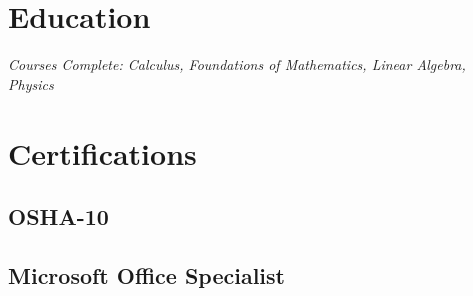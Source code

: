 \documentclass{my_resume}
\begin{document}
	\section{Education}
		\scriptsize{\textit{Courses Complete: Calculus, Foundations of Mathematics, Linear Algebra, Physics}}

	\section{Certifications}
		\subsection{OSHA-10}
		\subsection{Microsoft Office Specialist}
\end{document}
